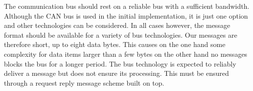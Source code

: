 The communication bus should rest on a reliable bus with a sufficient bandwidth. Although the CAN bus is used in the initial implementation, it is just one option and other technologies can be considered. In all cases however, the message format should be available for a variety of bus technologies. Our messages are therefore short, up to eight data bytes. This causes on the one hand some complexity for data items larger than a few bytes on the other hand no messages blocks the bus for a longer period. The bus technology is expected to reliably deliver a message but does not ensure its processing. This must be ensured through a request reply message scheme built on top.

